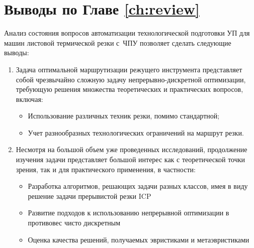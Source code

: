 
\section{%
  Выводы по Главе \ref{ch:review}
}
\label{sec:review.conclude}

Анализ состояния вопросов автоматизации технологической подготовки УП
для машин листовой термической резки с~ЧПУ
позволяет сделать следующие выводы:

\begin{enumerate}
  \item
  Задача оптимальной маршрутизации режущего инструмента
  представляет собой чрезвычайно сложную задачу непрерывно-дискретной оптимизации,
  требующую решения множества теоретических и практических вопросов,
  включая:
  \begin{itemize}
    \item Использование различных техник резки, помимо стандартной;
    \item Учет разнообразных технологических ограничений на маршрут резки.
  \end{itemize}
  \item Несмотря на большой объем уже проведенных исследований,
  продолжение изучения задачи представляет большой интерес
  как с теоретической точки зрения,
  так и для практического применения,
  в частности:
  \begin{itemize}
    \item Разработка алгоритмов, решающих задачи разных классов,
    имея в виду решение задачи прерывистой резки ICP
    \item Развитие подходов к использованию непрерывной оптимизации
    в противовес чисто дискретным
    \item Оценка качества решений,
    получаемых эвристиками и метаэвристиками
  \end{itemize}
\end{enumerate}
